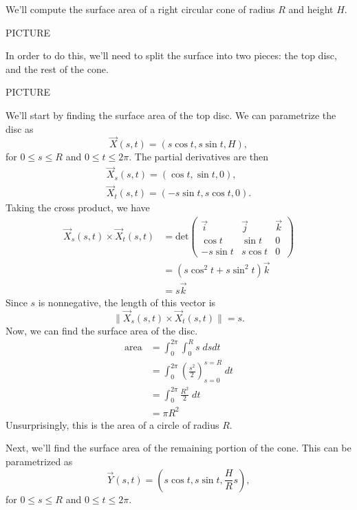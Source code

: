 \documentclass{ximera}
\begin{document}
\begin{example}
We'll compute the surface area of a right circular cone of radius $R$ and height $H$.

PICTURE

In order to do this, we'll need to split the surface into two pieces: the top disc, and the rest of the cone.

PICTURE

We'll start by finding the surface area of the top disc. We can parametrize the disc as
\[
\vec{X}(s,t) = (s\cos t, s\sin t, H),
\]
for $0\leq s\leq R$ and $0\leq t\leq 2\pi$. The partial derivatives are then
\begin{align*}
\vec{X}_s(s,t) = (\cos t, \sin t, 0),\\
\vec{X}_t(s,t) = (-s\sin t, s\cos t, 0).
\end{align*}
Taking the cross product, we have
\begin{align*}
\vec{X}_s(s,t)\times\vec{X}_t(s,t) &= \text{det}\begin{pmatrix}
\vec{i} & \vec{j} & \vec{k}\\
\cos t & \sin t & 0\\
-s\sin t & s\cos t & 0
\end{pmatrix}\\
&= (s\cos^2 t + s\sin^2 t)\vec{k}\\
&= s\vec{k}
\end{align*}
Since $s$ is nonnegative, the length of this vector is
\[
\|\vec{X}_s(s,t)\times\vec{X}_t(s,t)\| = s.
\]
Now, we can find the surface area of the disc.
\begin{align*}
\text{area} &= \int_0^{2\pi}\int_0^R s\;dsdt\\
&= \int_0^{2\pi} \left(\frac{s^2}{2}\right)_{s = 0}^{s = R}\;dt\\
&= \int_0^{2\pi} \frac{R^2}{2}\;dt\\
&= \pi R^2
\end{align*}
Unsurprisingly, this is the area of a circle of radius $R$.

Next, we'll find the surface area of the remaining portion of the cone. This can be parametrized as
\[
\vec{Y}(s,t) = \left(s \cos t, s \sin t, \frac{H}{R}s\right),
\]
for $0\leq s\leq R$ and $0\leq t\leq 2\pi$.


\end{example}
\end{document}
